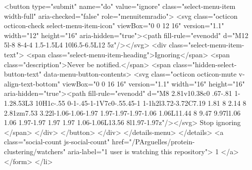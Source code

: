             <button type="submit" name="do" value="ignore" class="select-menu-item width-full" aria-checked="false" role="menuitemradio">
              <svg class="octicon octicon-check select-menu-item-icon" viewBox="0 0 12 16" version="1.1" width="12" height="16" aria-hidden="true"><path fill-rule="evenodd" d="M12 5l-8 8-4-4 1.5-1.5L4 10l6.5-6.5L12 5z"/></svg>
              <div class="select-menu-item-text">
                <span class="select-menu-item-heading">Ignoring</span>
                <span class="description">Never be notified.</span>
                <span class="hidden-select-button-text" data-menu-button-contents>
                  <svg class="octicon octicon-mute v-align-text-bottom" viewBox="0 0 16 16" version="1.1" width="16" height="16" aria-hidden="true"><path fill-rule="evenodd" d="M8 2.81v10.38c0 .67-.81 1-1.28.53L3 10H1c-.55 0-1-.45-1-1V7c0-.55.45-1 1-1h2l3.72-3.72C7.19 1.81 8 2.14 8 2.81zm7.53 3.22l-1.06-1.06-1.97 1.97-1.97-1.97-1.06 1.06L11.44 8 9.47 9.97l1.06 1.06 1.97-1.97 1.97 1.97 1.06-1.06L13.56 8l1.97-1.97z"/></svg>
                  Stop ignoring
                </span>
              </div>
            </button>
          </div>
        </details-menu>
      </details>
      <a class="social-count js-social-count"
        href="/PArguelles/protein-clustering/watchers"
        aria-label="1 user is watching this repository">
        1
      </a>
</form>
  </li>

